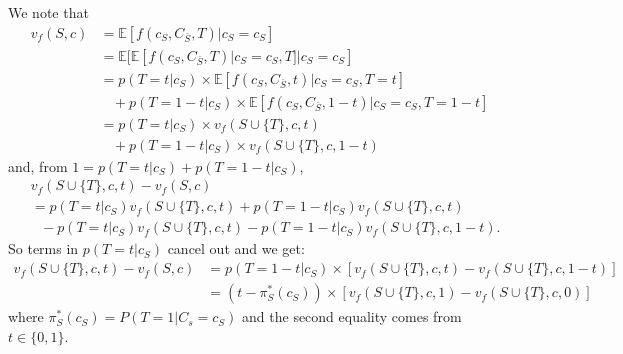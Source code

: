 \documentclass{article}
\theoremstyle{plain}
\theoremstyle{definition}
\theoremstyle{remark}
\theoremstyle{mystyle}
\begin{document}
We note that
\begin{align*}
    v_f(S,c) &=  \mathbb{E}[f(c_S, C_{\bar{S}}, T) | c_S = c_S] \\
    &=  \mathbb{E} [\mathbb{E}[f(c_S, C_{\bar{S}}, T) | c_S = c_S, T] | c_S=c_S] \\
    &= p(T=t | c_S) \times \mathbb{E}[f(c_S, C_{\bar{S}}, t)|c_S=c_S, T=t]  \\ 
    & \ \ \ \ + p(T=1-t|c_S) \times \mathbb{E}[f(c_S, C_{\bar{S}}, 1-t)|c_S=c_S, T=1-t] \\
    &= p(T=t|c_S) \times v_{f}(S \cup \{T\},c,t)  \\ 
     & \ \ \ \ + p(T=1-t|c_S) \times v_{f}(S \cup \{T\},c,1-t)
\end{align*}
and, from $1=p(T=t | c_S)+p(T=1-t | c_S)$,
\begin{align*}
    &v_{f}(S \cup \{T\},c,t) - v_{f}(S,c) \\
    &= p(T=t | c_S) v_{f}(S \cup \{T\},c,t)  + p(T=1-t | c_S) v_{f}(S \cup \{T\},c,t) \\
    & \ \ \ - p(T=t | c_S) v_{f}(S \cup \{T\},c,t) - p(T=1-t | c_S) v_{f}(S \cup \{T\},c,1-t).
\end{align*}
So terms in $p(T=t | c_S)$ cancel out and we get:
\begin{align*}
    v_{f}(S \cup \{T\},c,t) - v_{f}(S,c) &=  p(T=1-t | c_S) \times [ v_{f}(S \cup \{T\},c,t)   - v_{f}(S \cup \{T\},c,1-t)] \\
    &= (t - \pi^*_S(c_S)) \times [v_{f}(S \cup \{T\},c,1)  - v_{f}(S \cup \{T\},c,0)]
\end{align*}
where $\pi^*_S(c_S) = P(T=1|C_s=c_S)$ and the second equality comes from $t \in \{0,1\}$. 
\end{document}
